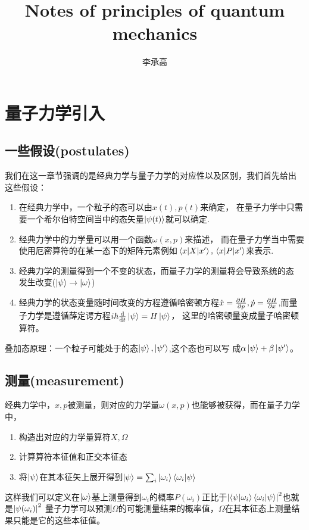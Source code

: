 \documentclass[UTF8]{article}
\title{Notes of principles of quantum mechanics}
\author{李承高}
\numberwithin{equation}{section}
\begin{document}
\maketitle
\thispagestyle{empty}
\newpage
\thispagestyle{empty}
\tableofcontents
\newpage


\section{量子力学引入}
\subsection{一些假设(postulates)}
我们在这一章节强调的是经典力学与量子力学的对应性以及区别，我们首先给出
这些假设：
\begin{enumerate}
    \item 在经典力学中，一个粒子的态可以由$x(t),p(t)$来确定，
          在量子力学中只需要一个希尔伯特空间当中的态矢量$\ket{\psi(t)}$就可以确定.
    \item 经典力学中的力学量可以用一个函数$\omega(x,p)$来描述，
          而在量子力学当中需要使用厄密算符的在某一态下的矩阵元素例如$\mel{x}{X}{x'},\mel{x}{P}{x'}$来表示.
    \item 经典力学的测量得到一个不变的状态，而量子力学的测量将会导致系统的态
          发生改变($\ket{\psi}\rightarrow \ket{\omega}$)
    \item 经典力学的状态变量随时间改变的方程遵循哈密顿方程$\dot{x}=\pdv{H}{p},
              \dot{p}=\pdv{H}{x}$,而量子力学是遵循薛定谔方程$i\hbar\dv{}{t}\ket{\psi}=H\ket{\psi}$，
          这里的哈密顿量变成量子哈密顿算符。
\end{enumerate}
叠加态原理：一个粒子可能处于的态$\ket{\psi},\ket{\psi'}$,这个态也可以写
成$\alpha\ket{\psi}+\beta\ket{\psi'}$。
\subsection{测量(measurement)}
经典力学中，$x,p$被测量，则对应的力学量$\omega(x,p)$也能够被获得，而在量子力学中，
\begin{tcolorbox}[colframe=red,title=量子力学中的测量步骤]
    \begin{enumerate}
        \item 构造出对应的力学量算符$X,\Omega$
        \item 计算算符本征值和正交本征态
        \item 将$\ket{\psi}$在其本征矢上展开得到$\ket{\psi}=\sum_i\ket{\omega_i}\braket{\omega_i}{\psi}$
    \end{enumerate}
\end{tcolorbox}
这样我们可以定义在$\ket{\omega}$基上测量得到$\omega_i$的概率$P(\omega_i)$正比于$\abs{\braket{\psi}{\omega_i}\braket{\omega_i}{\psi}}^2$也就是$\abs{\psi(\omega_i)}^2$
量子力学可以预测$\Omega$的可能测量结果的概率值，$\Omega$在其本征态上测量结果只能是它的这些本征值。
\end{document}
